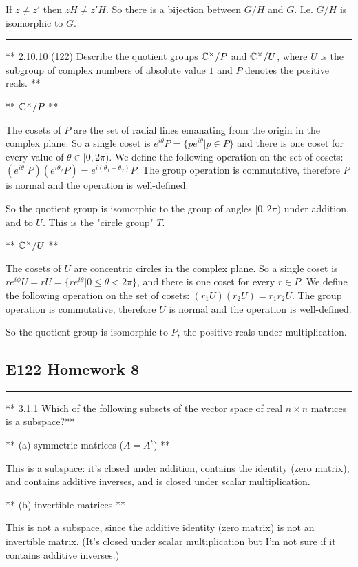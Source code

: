 If $z \neq z'$ then $zH \neq z'H$. So there is a bijection between $G/H$ and
$G$. I.e. $G/H$ is isomorphic to $G$.

\hrule

** 2.10.10 (122) Describe the quotient groups $\mathbb{C}^\times / P$ and $\mathbb{C}^\times /
U$, where $U$ is the subgroup of complex numbers of absolute value $1$ and $P$
denotes the positive reals. **

** $\mathbb{C}^\times / P$ **

The cosets of $P$ are the set of radial lines emanating from the origin in the
complex plane. So a single coset is $e^{i\theta}P = \{pe^{i\theta} | p \in P\}$
and there is one coset for every value of $\theta \in [0, 2\pi)$. We define the
following operation on the set of cosets:
$(e^{i\theta_1}P)(e^{i\theta_2}P) = e^{i(\theta_1 + \theta_2)}P$. The group operation is commutative, therefore $P$ is normal and the operation is well-defined.

So the quotient group is isomorphic to the group of angles $[0, 2\pi)$ under addition, and to $U$. This is the "circle group" $T$.


** $\mathbb{C}^\times / U$ **

The cosets of $U$ are concentric circles in the complex plane. So a single coset is $re^{i\phi}U = rU = \{re^{i\theta}|0\leq\theta<2\pi\}$, and there is one coset for every $r \in P$. We define the
following operation on the set of cosets: $(r_1U)(r_2U) = r_1r_2U$. The group operation is commutative, therefore $U$ is normal and the operation is well-defined.

So the quotient group is isomorphic to $P$, the positive reals under multiplication.

\subsection{E122 Homework 8}


\hrule

** 3.1.1 Which of the following subsets of the vector space of real $n \times
n$ matrices is a subspace?**

** (a) symmetric matrices ($A = A^t$) **

This is a subspace: it's closed under addition, contains the identity (zero
matrix), and contains additive inverses, and is closed under scalar
multiplication.

** (b) invertible matrices **

This is not a subspace, since the additive identity (zero matrix) is not an
invertible matrix. (It's closed under scalar multiplication but I'm not sure if
it contains additive inverses.)

